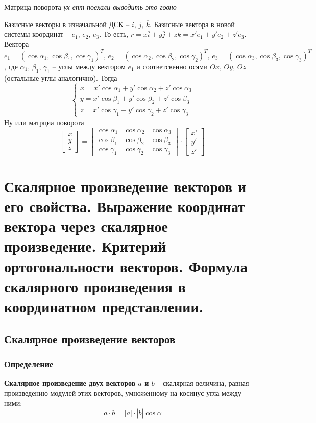 \documentclass{article}
\begin{document}
    Матрица поворота
    \textit{ух епт поехали выводить это говно}
    
    Базисные векторы в изначальной ДСК -- $\overline{i},\,\overline{
    j},\,\overline{k}$. Базисные вектора в новой системы координат -- $\overline{e}_1,\,\overline{e}_2,\,\overline{e}_3$. То есть, $\overline{r}=x\overline{i}+y\overline{j}+z\overline{k}=x'\overline{e}_1+y'\overline{e}_2+z'\overline{e}_3 $. Вектора $\overline{e}_1=(\cos\alpha_1,\cos\beta_1,\cos\gamma_1)^T,\,\overline{e}_2=(\cos\alpha_2,\cos\beta_2,\cos\gamma_2)^T,\,\overline{e}_3=(\cos\alpha_3,\cos\beta_3,\cos\gamma_3)^T$, где $\alpha_1,\,\beta_1,\,\gamma_1$ -- углы между вектором $\overline{e}_1$ и соответсвенно осями $Ox,\,Oy,\,Oz$ (остальные углы аналогично). Тогда
    $$ \begin{cases} x=x'\cos\alpha_1+y'\cos\alpha_2+z'\cos\alpha_3 \\ y=x'\cos\beta_1+y'\cos\beta_2+z'\cos\beta_3 \\ z=x'\cos\gamma_1+y'\cos\gamma_2+z'\cos\gamma_3 \end{cases} $$
    Ну или матрциа поворота
    \[
    \begin{bmatrix}
    x \\
    y \\
    z
    \end{bmatrix}
    =
    \begin{bmatrix}
    \cos\alpha_1 & \cos\alpha_2 & \cos\alpha_3 \\
    \cos\beta_1 & \cos\beta_2 & \cos\beta_3 \\
    \cos\gamma_1 & \cos\gamma_2 & \cos\gamma_3
    \end{bmatrix} \cdot 
    \begin{bmatrix}
    x' \\
    y' \\
    z'
    \end{bmatrix}
    \]
    
\newpage
\section{Скалярное произведение векторов и его свойства. Выражение координат вектора через скалярное произведение. Критерий ортогональности векторов. Формула скалярного произведения в координатном представлении.}
\subsection{Скалярное произведение векторов}
\subsubsection{Определение}
\textbf{Скалярное произведение двух векторов $\overline{a}$ и $\overline{b}$} -- скалярная величина, равная
произведению модулей этих векторов, умноженному на косинус угла между ними:
$$\overline{a}\cdot \overline{b} = |\overline{a}|\cdot |\overline{b}| \cos\alpha$$
\end{document}
